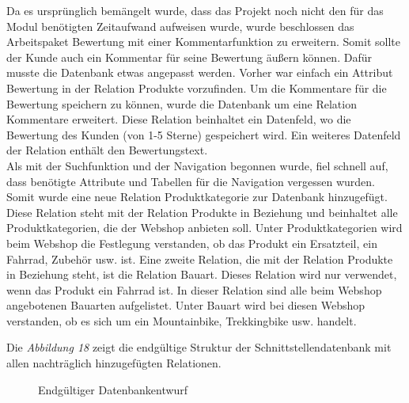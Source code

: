 Da es ursprünglich bemängelt wurde, dass das Projekt noch nicht den für das Modul benötigten Zeitaufwand aufweisen wurde, wurde beschlossen das Arbeitspaket \glqq Bewertung\grqq{} mit einer Kommentarfunktion zu erweitern. Somit sollte der Kunde auch ein Kommentar für seine Bewertung äußern können. Dafür musste die Datenbank etwas angepasst werden. Vorher war einfach ein Attribut \glqq Bewertung\grqq{} in der Relation \glqq Produkte\grqq{} vorzufinden. Um die Kommentare für die Bewertung speichern zu können, wurde die Datenbank um eine Relation \glqq Kommentare\grqq{} erweitert. Diese Relation beinhaltet ein Datenfeld, wo die Bewertung des Kunden (von 1-5 Sterne) gespeichert wird. Ein weiteres Datenfeld der Relation enthält den Bewertungstext. \\
Als mit der Suchfunktion und der Navigation begonnen wurde, fiel schnell auf, dass benötigte Attribute und Tabellen für die Navigation vergessen wurden. Somit wurde eine neue Relation \glqq Produktkategorie\grqq{} zur Datenbank hinzugefügt. Diese Relation steht mit der Relation \glqq Produkte\grqq{} in Beziehung und beinhaltet alle Produktkategorien, die der Webshop anbieten soll. Unter Produktkategorien wird beim Webshop die Festlegung verstanden, ob das Produkt ein Ersatzteil, ein Fahrrad, Zubehör usw. ist. Eine zweite Relation, die mit der Relation Produkte in Beziehung steht, ist die Relation \glqq Bauart\grqq{}. Dieses Relation wird nur verwendet, wenn das Produkt ein Fahrrad ist. In dieser Relation sind alle beim Webshop angebotenen Bauarten aufgelistet. Unter Bauart wird bei diesen Webshop verstanden, ob es sich um ein Mountainbike, Trekkingbike usw. handelt.

Die \textit{Abbildung 18} zeigt die endgültige Struktur der Schnittstellendatenbank mit allen nachträglich hinzugefügten Relationen. 
\begin{figure}[H]
	\begin{center}
	\end{center}
	\caption{Endgültiger Datenbankentwurf}
\end{figure}

